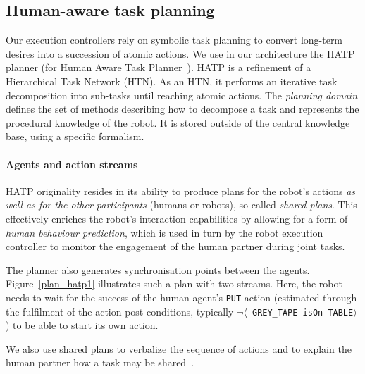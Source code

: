 \documentclass[preprint,3p,times]{elsarticle}
\newcommand{\stmt}[1]{{\footnotesize \tt $\langle$ #1\relax$\rangle$}}
\begin{document}

\subsection{Human-aware task planning}
\label{hatp}

Our execution controllers rely on symbolic task planning to convert long-term
desires into a succession of atomic actions. We use in our architecture the
HATP planner (for Human Aware Task Planner~\cite{Alili2008, Alili2009}).  HATP
is a refinement of a Hierarchical Task Network (HTN). As an HTN, it performs an
iterative task decomposition into sub-tasks until reaching atomic actions. The
\emph{planning domain} defines the set of methods describing how to decompose a
task and represents the procedural knowledge of the robot. It is stored outside
of the central knowledge base, using a specific formalism.

\paragraph{Agents and action streams}

HATP originality resides in its ability to produce plans for the robot's actions
\emph{as well as for the other participants} (humans or robots), so-called
\emph{shared plans}. This effectively enriches the robot's interaction
capabilities by allowing for a form of \emph{human behaviour prediction}, which
is used in turn by the robot execution controller to monitor the engagement of
the human partner during joint tasks.

The planner also generates synchronisation points between the agents.
Figure~\ref{plan_hatp1} illustrates such a plan with two streams.  Here, the
robot needs to wait for the success of the human agent's {\tt PUT} action
(estimated through the fulfilment of the action post-conditions, typically
$\neg$\stmt{GREY\_TAPE isOn TABLE}) to be able to start its own action.

We also use shared plans to verbalize the sequence of actions and to explain
the human partner how a task may be shared~\cite{warnier2012when}.
\end{document}

